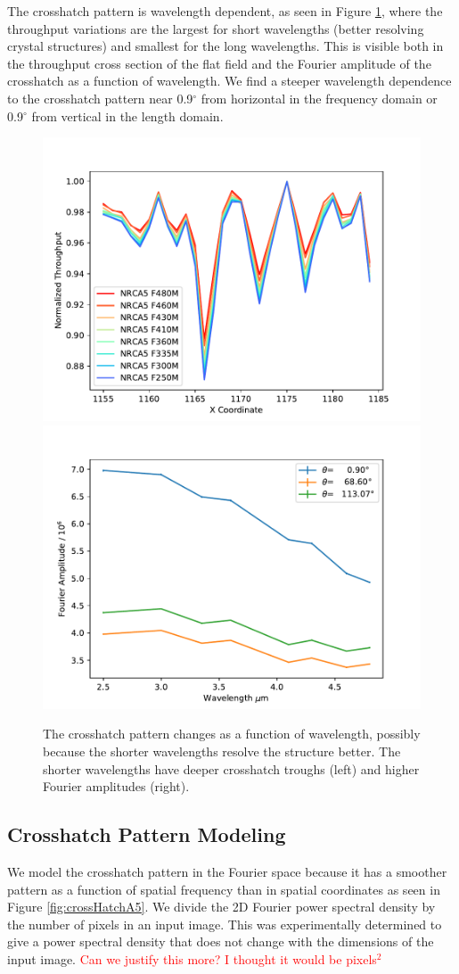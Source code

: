 \documentclass[]{aastex62}
\newcommand{\degree}{^\circ}
\begin{document}
The crosshatch pattern is wavelength dependent, as seen in Figure \ref{fig:crossHatchWavelengthDep}, where the throughput variations are the largest for short wavelengths (better resolving crystal structures) and smallest for the long wavelengths.
This is visible both in the throughput cross section of the flat field and the Fourier amplitude of the crosshatch as a function of wavelength.
We find a steeper wavelength dependence to the crosshatch pattern near 0.9$\degree$ from horizontal in the frequency domain or 0.9$\degree$ from vertical in the length domain.

\begin{figure}[!hbtp]
\centering
\includegraphics[width=.49\columnwidth]{cross_sec_of_crosshatch.pdf}
\includegraphics[width=.49\columnwidth]{fourier_power_from_fit.pdf}
\caption{
The crosshatch pattern changes as a function of wavelength, possibly because the shorter wavelengths resolve the structure better.
The shorter wavelengths have deeper crosshatch troughs (left) and higher Fourier amplitudes (right).
}\label{fig:crossHatchWavelengthDep}
\end{figure}


\subsection{Crosshatch Pattern Modeling}\label{sec:crosshatchModeling}
We model the crosshatch pattern in the Fourier space because it has a smoother pattern as a function of spatial frequency than in spatial coordinates as seen in Figure \ref{fig:crossHatchA5}.
We divide the 2D Fourier power spectral density by the number of pixels in an input image.
This was experimentally determined to give a power spectral density that does not change with the dimensions of the input image.
\textcolor{red}{Can we justify this more? I thought it would be pixels$^2$}
\end{document}
